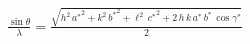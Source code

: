 


\begin{eqnarray*}
  \frac{\sin \theta}{\lambda} = \frac{\sqrt{h^2\,{a^\ast}^2+k^2\,{b^\ast}^2+\ell^2\,{c^\ast}^2 + 
2\,h\,k\,a^\ast\,b^\ast\,\cos \gamma ^\ast}}{2}
\end{eqnarray*}

